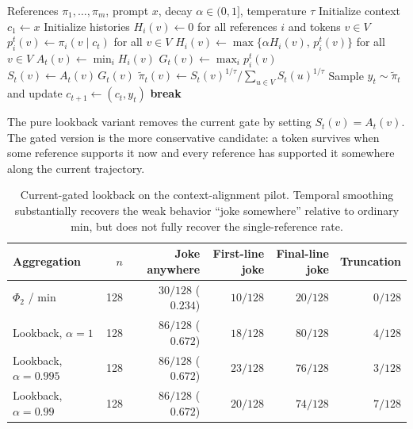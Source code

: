 \documentclass[11pt]{article}
\begin{document}
\begin{algorithm}[htbp]
\caption{Current-gated lookback min}
\label{alg:lookback-min}
\begin{algorithmic}[1]
\Require References $\pi_1,\ldots,\pi_m$, prompt $x$, decay $\alpha\in(0,1]$, temperature $\tau$
\State Initialize context $c_1 \gets x$
\State Initialize histories $H_i(v) \gets 0$ for all references $i$ and tokens $v\in V$
        \State $p_i^t(v) \gets \pi_i(v\mid c_t)$ for all $v\in V$
        \State $H_i(v) \gets \max\{\alpha H_i(v),\, p_i^t(v)\}$ for all $v\in V$
    \EndFor
    \State $A_t(v) \gets \min_i H_i(v)$ 
    \State $G_t(v) \gets \max_i p_i^t(v)$ 
    \State $S_t(v) \gets A_t(v)\,G_t(v)$
    \State $\tilde{\pi}_t(v) \gets S_t(v)^{1/\tau} / \sum_{u\in V} S_t(u)^{1/\tau}$
    \State Sample $y_t \sim \tilde{\pi}_t$ and update $c_{t+1}\gets(c_t,y_t)$
        \State \textbf{break}
    \EndIf
\EndFor
\end{algorithmic}
\end{algorithm}

The pure lookback variant removes the current gate by setting $S_t(v)=A_t(v)$. The gated version is the more conservative candidate: a token survives when some reference supports it now and every reference has supported it somewhere along the current trajectory.

\begin{table}[htbp]
\centering
\small
\begin{tabular}{lrrrrr}
\toprule
Aggregation & $n$ & Joke anywhere & First-line joke & Final-line joke & Truncation \\
\midrule
$\Phi_2$ / min & 128 & $30/128$ ($0.234$) & $10/128$ & $20/128$ & $0/128$ \\
Lookback, $\alpha=1$ & 128 & $86/128$ ($0.672$) & $18/128$ & $80/128$ & $4/128$ \\
Lookback, $\alpha=0.995$ & 128 & $86/128$ ($0.672$) & $23/128$ & $76/128$ & $3/128$ \\
Lookback, $\alpha=0.99$ & 128 & $86/128$ ($0.672$) & $20/128$ & $74/128$ & $7/128$ \\
\bottomrule
\end{tabular}
\caption{Current-gated lookback on the context-alignment pilot. Temporal smoothing substantially recovers the weak behavior ``joke somewhere'' relative to ordinary min, but does not fully recover the single-reference rate.}
\label{tab:lookback-context}
\end{table}
\end{document}
